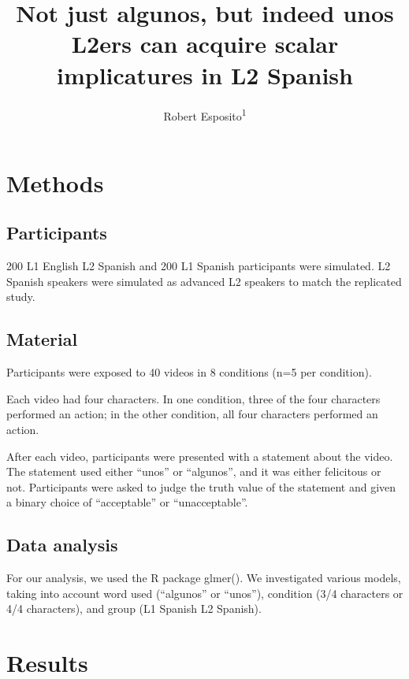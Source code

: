 \documentclass[
  man]{apa6}
\title{Not just algunos, but indeed unos L2ers can acquire scalar implicatures in L2 Spanish}
\author{Robert Esposito\textsuperscript{1}}
\date{}
\affiliation{\vspace{0.5cm}\textsuperscript{1} Rutgers University}
\begin{document}
\maketitle

\hypertarget{methods}{%
\section{Methods}\label{methods}}

\hypertarget{participants}{%
\subsection{Participants}\label{participants}}

200 L1 English L2 Spanish and 200 L1 Spanish participants were simulated. L2 Spanish speakers were simulated as advanced L2 speakers to match the replicated study.

\hypertarget{material}{%
\subsection{Material}\label{material}}

Participants were exposed to 40 videos in 8 conditions (n=5 per condition).

Each video had four characters. In one condition, three of the four characters performed an action; in the other condition, all four characters performed an action.

After each video, participants were presented with a statement about the video. The statement used either ``unos'' or ``algunos'', and it was either felicitous or not. Participants were asked to judge the truth value of the statement and given a binary choice of ``acceptable'' or ``unacceptable''.

\hypertarget{data-analysis}{%
\subsection{Data analysis}\label{data-analysis}}

For our analysis, we used the R package glmer(). We investigated various models, taking into account word used (``algunos'' or ``unos''), condition (3/4 characters or 4/4 characters), and group (L1 Spanish L2 Spanish).

\hypertarget{results}{%
\section{Results}\label{results}}
\end{document}
